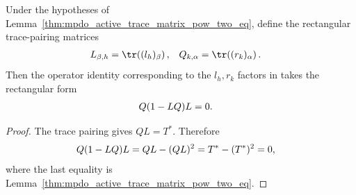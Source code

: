\begin{lemma}
    \label{thm:mpdo_casei_rectangular_remainder}
    \leanok
    Under the hypotheses of
    Lemma~\ref{thm:mpdo_active_trace_matrix_pow_two_eq}, define the
    rectangular trace-pairing matrices
    \begin{align}
        L_{\beta,h} & =\tr\!\left((l_h)_\beta\right),
                    & Q_{k,\alpha}                    & =\tr\!\left((r_k)_\alpha\right).
        \notag
    \end{align}
    Then the operator identity corresponding to the $l_h,r_k$ factors in
    \cite[Appendix~C.2, Lemma~C.5, lines~1473--1499]{Cirac2016MPDO_arXiv}
    takes the rectangular form
    \begin{align}
        Q(1-LQ)L & =0.
        \notag
    \end{align}
\end{lemma}

\begin{proof}
    \leanok
    The trace pairing gives $QL=T^*$. Therefore
    \begin{align}
        Q(1-LQ)L
         & =QL-(QL)^2
        =T^*-(T^*)^2
        =0,
        \notag
    \end{align}
    where the last equality is
    Lemma~\ref{thm:mpdo_active_trace_matrix_pow_two_eq}.
\end{proof}
